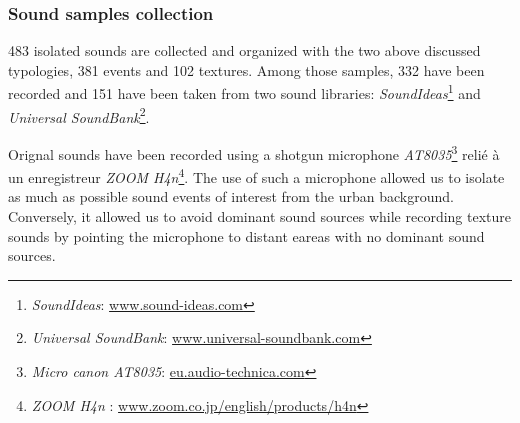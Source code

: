 \documentclass[twoside,twocolumn]{article}
\begin{document}
\subsubsection*{Sound samples collection}


483 isolated sounds are collected and organized with the two above discussed typologies, 381 events and 102 textures. Among those samples, 332 have been recorded and 151 have been taken from two sound libraries: \emph{SoundIdeas}\footnote{\emph{SoundIdeas}: \url{www.sound-ideas.com}} and \emph{Universal SoundBank}\footnote{\emph{Universal SoundBank}: \url{www.universal-soundbank.com}}.


Orignal sounds have been recorded using a shotgun microphone \emph{AT8035}\footnote{\emph{Micro canon AT8035}: \url{eu.audio-technica.com}} relié à un enregistreur \emph{ZOOM H4n}\footnote{\emph{ZOOM H4n} : \url{www.zoom.co.jp/english/products/h4n}}. The use of such a microphone allowed us to isolate as much as possible sound events of interest from the urban background. Conversely, it allowed us to avoid dominant sound sources while recording texture sounds by pointing the microphone to distant eareas with no dominant sound sources.

\end{document}
